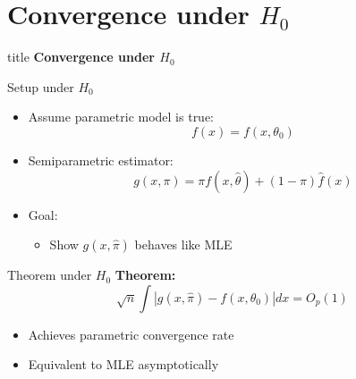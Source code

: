 \section{Convergence under $H_0$}
\begin{frame}{\hspace{3cm}}
\centering

\vspace{1.5cm}

\begin{beamercolorbox}[sep=20pt,center,rounded=true,shadow=true]{title}
    {\fontsize{20}{24}\selectfont \textbf{Convergence under $H_0$}}
\end{beamercolorbox}

\vspace{0.8cm}


\vfill

\end{frame}

\begin{frame}{Setup under $H_0$}
\begin{itemize}
    \item Assume parametric model is true:
    \[
    f(x) = f(x,\theta_0)
    \]

    \item Semiparametric estimator:
    \[
    g(x,\pi)=\pi f(x,\hat{\theta})+(1-\pi)\hat{f}(x)
    \]

    \item Goal:
    \begin{itemize}
        \item Show $g(x,\hat{\pi})$ behaves like MLE
    \end{itemize}
\end{itemize}
\end{frame}


\begin{frame}{Theorem under $H_0$}
\textbf{Theorem:}
\[
\sqrt{n} \int |g(x,\hat{\pi}) - f(x,\theta_0)| dx = O_p(1)
\]

\begin{itemize}
    \item Achieves parametric convergence rate
    \item Equivalent to MLE asymptotically
\end{itemize}
\end{frame}


